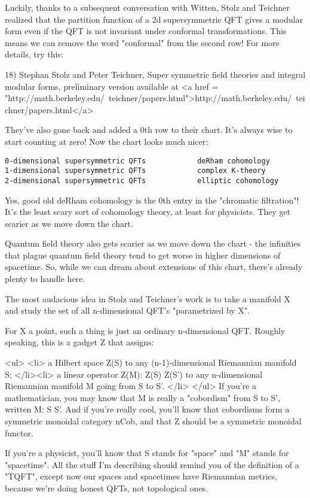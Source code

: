 Luckily, thanks to a subsequent conversation with Witten, 
Stolz and Teichner realized that the partition function of a 
2d supersymmetric QFT gives a modular form even if the QFT is
not invariant under conformal transformations.  This means we 
can remove the word "conformal" from the second row!  For more
details, try this:

18) Stephan Stolz and Peter Teichner, Super symmetric field 
theories and integral modular forms, preliminary version
available at <a href = "http://math.berkeley.edu/~teichner/papers.html">http://math.berkeley.edu/~teichner/papers.html</a>

They've also gone back and added a 0th row to their chart. 
It's always wise to start counting at zero!  Now the chart 
looks much nicer:

\begin{verbatim}
0-dimensional supersymmetric QFTs            deRham cohomology
1-dimensional supersymmetric QFTs            complex K-theory
2-dimensional supersymmetric QFTs            elliptic cohomology
\end{verbatim}
    

Yes, good old deRham cohomology is the 0th entry in the 
"chromatic filtration"!  It's the least scary sort of cohomology
theory, at least for physicists.  They get scarier as we move
down the chart.  

Quantum field theory also gets scarier as we move down the chart -
the infinities that plague quantum field theory tend to get worse  
in higher dimensions of spacetime.  So, while we can dream about 
extensions of this chart, there's already plenty to handle here.

The most audacious idea in Stolz and Teichner's work is to take 
a manifold X and study the set of all n-dimensional QFT's 
"parametrized by X".  

For X a point, such a thing is just an ordinary n-dimensional 
QFT.  Roughly speaking, this is a gadget Z that assigns:

<ul>
<li>
 a Hilbert space Z(S) to any (n-1)-dimensional Riemannian 
 manifold S; 
</li><li>
 a linear operator Z(M): Z(S) \to  Z(S') to any n-dimensional 
 Riemannian manifold M going from S to S'. 
</li>
</ul>
If you're a mathematician, you may know that M is really a
"cobordism" from S to S', written M: S \to  S'.  And if you're 
really cool, you'll know that cobordisms form a symmetric monoidal 
category nCob, and that Z should be a symmetric monoidal 
functor.  

If you're a physicist, you'll know that S stands for "space"
and "M" stands for "spacetime".  All the stuff I'm
describing should remind you of the definition of a "TQFT",
except now our spaces and spacetimes have Riemannian metrics, because
we're doing honest QFTs, not topological ones.

